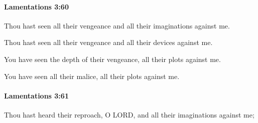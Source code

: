 		\paragraph{Lamentations 3:60} %
			\label{LAMENTATIONS-3-60}

			Thou hast seen all their vengeance and all their imaginations against me.

			\begin{versebox}
					\item[BHS] 
					\item[LXX] 
					\item[ASV] Thou hast seen all their vengeance and all their devices against me.
					\item[NIV] You have seen the depth of their vengeance, all their plots against me.
					\item[NRSV] You have seen all their malice, all their plots against me.
			\end{versebox}

		\paragraph{Lamentations 3:61} %
			\label{LAMENTATIONS-3-61}

			Thou hast heard their reproach, O LORD, and all their imaginations against me;

